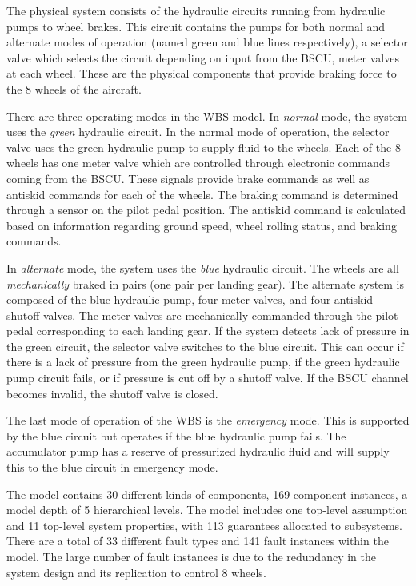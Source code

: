The physical system consists of the hydraulic circuits running from hydraulic pumps to wheel brakes. This circuit contains the pumps for both normal and alternate modes of operation (named green and blue lines respectively), a selector valve which selects the circuit depending on input from the BSCU, meter valves at each wheel. These are the physical components that provide braking force to the 8 wheels of the aircraft.

There are three operating modes in the WBS model. In \textit{normal} mode, the system uses the \textit{green} hydraulic circuit. In the normal mode of operation, the selector valve uses the green hydraulic pump to supply fluid to the wheels. Each of the 8 wheels has one meter valve which  are controlled through electronic commands coming from the BSCU. These signals provide brake commands as well as antiskid commands for each of the wheels. The braking command is determined through a sensor on the pilot pedal position. The antiskid command is calculated based on information regarding ground speed, wheel rolling status, and braking commands.

In \textit{alternate} mode, the system uses the \textit{blue} hydraulic circuit.  The wheels are all \textit{mechanically} braked in pairs (one pair per landing gear). The alternate system is composed of the blue hydraulic pump, four meter valves, and four antiskid shutoff valves. The meter valves are mechanically commanded through the pilot pedal corresponding to each landing gear. If the system detects lack of pressure in the green circuit, the selector valve switches to the blue circuit. This can occur if there is a lack of pressure from the green hydraulic pump, if the green hydraulic pump circuit fails, or if pressure is cut off by a shutoff valve. If the BSCU channel becomes invalid, the shutoff valve is closed.

The last mode of operation of the WBS is the \textit{emergency} mode. This is supported by the blue circuit but operates if the blue hydraulic pump fails. The accumulator pump has a reserve of pressurized hydraulic fluid and will supply this to the blue circuit in emergency mode.

The model contains 30 different kinds of components, 169 component instances, a model depth of 5 hierarchical levels.  The model includes one top-level assumption and  11 top-level system properties, with 113 guarantees allocated to subsystems.  There are a total of 33 different fault types and 141 fault instances within the model.  The large number of fault instances is due to the redundancy in the system design and its replication to control 8 wheels. 

